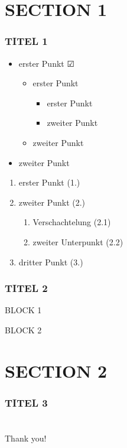 \documentclass[11pt,aspectratio=169]{beamer}%
\begin{document}
\section{SECTION 1}
\begin{frame}
\frametitle{TITEL 1}

\begin{itemize}			
	\item<1-> erster Punkt $\CheckedBox$
	\begin{itemize}			
	\item<2->  erster Punkt
		\begin{itemize}			
		\item<3->  erster Punkt
		\item<4->  zweiter Punkt
		\end{itemize}
		\item<5->  zweiter Punkt
	\end{itemize}
	\item<6->  zweiter Punkt
\end{itemize}
 
\begin{enumerate}		
	\item erster Punkt (1.)
	\item zweiter Punkt (2.)
	\begin{enumerate}
		\item Verschachtelung (2.1)
		\item zweiter Unterpunkt (2.2)
	\end{enumerate}
	\item dritter Punkt (3.)
\end{enumerate}

\end{frame}
\begin{frame}
\frametitle{TITEL 2}
\begin{block}{BLOCK 1}

\end{block}
\begin{alertblock}{BLOCK 2}

\end{alertblock}
\end{frame}
\section{SECTION 2}
\begin{frame}
\frametitle{TITEL 3}

\end{frame}
\section{}
\begin{frame}
\begin{center}
{\Huge { \textcolor{cl1}{Thank you!}}}
\end{center}
\end{frame}
\end{document}

